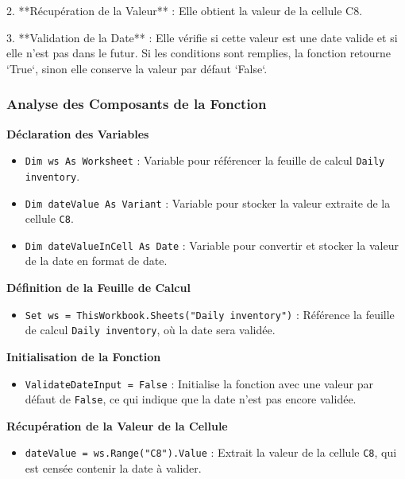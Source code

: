 \documentclass[a4paper, oneside, 12pt, final]{extreport}
\begin{document}
2. **Récupération de la Valeur** : Elle obtient la valeur de la cellule C8.

3. **Validation de la Date** : Elle vérifie si cette valeur est une date valide et si elle n'est pas dans le futur. Si les conditions sont remplies, la fonction retourne `True`, sinon elle conserve la valeur par défaut `False`.

\subsubsection{Analyse des Composants de la Fonction}

\textbf{Déclaration des Variables}

\begin{itemize}
    \item \texttt{Dim ws As Worksheet} : Variable pour référencer la feuille de calcul \texttt{Daily inventory}.
    \item \texttt{Dim dateValue As Variant} : Variable pour stocker la valeur extraite de la cellule \texttt{C8}.
    \item \texttt{Dim dateValueInCell As Date} : Variable pour convertir et stocker la valeur de la date en format de date.
\end{itemize}

\textbf{Définition de la Feuille de Calcul}

\begin{itemize}
    \item \texttt{Set ws = ThisWorkbook.Sheets("Daily inventory")} : Référence la feuille de calcul \texttt{Daily inventory}, où la date sera validée.
\end{itemize}

\textbf{Initialisation de la Fonction}

\begin{itemize}
    \item \texttt{ValidateDateInput = False} : Initialise la fonction avec une valeur par défaut de \texttt{False}, ce qui indique que la date n'est pas encore validée.
\end{itemize}

\textbf{Récupération de la Valeur de la Cellule}

\begin{itemize}
    \item \texttt{dateValue = ws.Range("C8").Value} : Extrait la valeur de la cellule \texttt{C8}, qui est censée contenir la date à valider.
\end{itemize}
\end{document}
